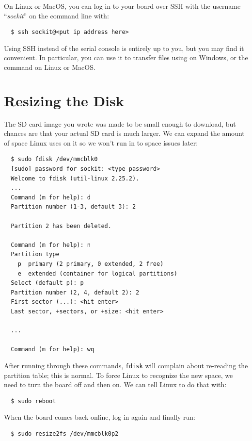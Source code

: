 \documentclass{sockitguide}
\begin{document}
On Linux or MacOS, you can log in to your board over SSH with the
username ``\textit{sockit}'' on the command line with:
\begin{verbatim}
  $ ssh sockit@<put ip address here>
\end{verbatim}

Using SSH instead of the serial console is entirely up to you, but you
may find it convenient. In particular, you can use it to transfer
files using  on
Windows, or the 
command on Linux or MacOS.

\section{Resizing the Disk}

The SD card image you wrote was made to be small enough to download,
but chances are that your actual SD card is much larger. We can expand
the amount of space Linux uses on it so we won't run in to space
issues later:
\begin{verbatim}
  $ sudo fdisk /dev/mmcblk0
  [sudo] password for sockit: <type password>
  Welcome to fdisk (util-linux 2.25.2).
  ...
  Command (m for help): d
  Partition number (1-3, default 3): 2

  Partition 2 has been deleted.

  Command (m for help): n
  Partition type
    p  primary (2 primary, 0 extended, 2 free)
    e  extended (container for logical partitions)
  Select (default p): p
  Partition number (2, 4, default 2): 2
  First sector (...): <hit enter>
  Last sector, +sectors, or +size: <hit enter>

  ...

  Command (m for help): wq
\end{verbatim}

After running through these commands, \texttt{fdisk} will complain
about re-reading the partition table; this is normal. To force Linux
to recognize the new space, we need to turn the board off and then
on. We can tell Linux to do that with:
\begin{verbatim}
  $ sudo reboot
\end{verbatim}

When the board comes back online, log in again and finally run:
\begin{verbatim}
  $ sudo resize2fs /dev/mmcblk0p2
\end{verbatim}
\end{document}
